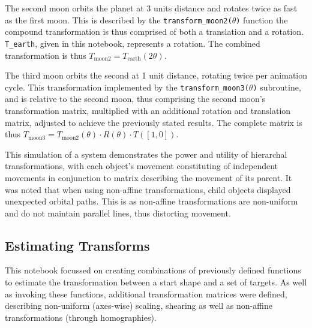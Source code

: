 \documentclass[10pt,a4paper]{article}
\begin{document}
The second moon orbits the planet at 3 units distance and rotates twice as fast as the first moon. This is described by the \texttt{transform\_moon2($\theta$)} function the compound transformation is thus comprised of both a translation and a rotation.  \texttt{T\_earth}, given in this notebook, represents a rotation. The combined transformation is thus $T_{\text{moon2}} = T_{\text{earth}}(2\theta)$.
	 
The third moon orbits the second at 1 unit distance, rotating twice per animation cycle. This transformation implemented by the \texttt{transform\_moon3($\theta$)} subroutine, and is relative to the second moon, thus comprising the second moon’s transformation matrix, multiplied with an additional rotation and translation matrix, adjusted to achieve the previously stated results. The complete matrix is thus $T_{\text{moon3}} = T_{\text{moon2}}(\theta) \cdot R(\theta) \cdot T([1, 0])$.
	 
This simulation of a system demonstrates the power and utility of hierarchal transformations, with each object’s movement constituting of independent movements in conjunction to matrix describing the movement of its parent. It was noted that when using non-affine transformations, child objects displayed unexpected orbital paths. This is as non-affine transformations are non-uniform and do not maintain parallel lines, thus distorting movement. 


\subsection{Estimating Transforms}

This notebook focussed on creating combinations of previously defined functions to estimate the transformation between a start shape and a set of targets. As well as invoking these functions, additional transformation matrices were defined, describing non-uniform (axes-wise) scaling, shearing as well as non-affine transformations (through homographies). 
\end{document}
